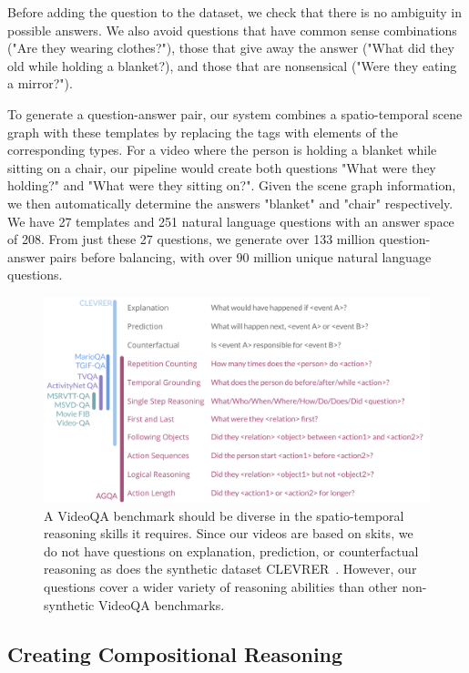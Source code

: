 Before adding the question to the dataset, we check that there is no ambiguity in possible answers. We also avoid questions that have common sense combinations ("Are they wearing clothes?"), those that give away the answer ("What did they old while holding a blanket?), and those that are nonsensical ("Were they eating a mirror?").

To generate a question-answer pair, our system combines a spatio-temporal scene graph with these templates by replacing the tags with elements of the corresponding types. For a video where the person is holding a blanket while sitting on a chair, our pipeline would create both questions "What were they holding?" and "What were they sitting on?". Given the scene graph information, we then automatically determine the answers "blanket" and "chair" respectively. We have 27 templates and 251 natural language questions with an answer space of 208. From just these 27 questions, we generate over 133 million question-answer pairs before balancing, with over 90 million unique natural language questions.

\begin{figure}[t]
    \centering
    \includegraphics[width=\columnwidth]{figures/questions.pdf}
    \caption{A VideoQA benchmark should be diverse in the spatio-temporal reasoning skills it requires. Since our videos are based on skits, we do not have questions on explanation, prediction, or counterfactual reasoning as does the synthetic dataset CLEVRER~\cite{yi2019clevrer}. However, our questions cover a wider variety of reasoning abilities than other non-synthetic VideoQA benchmarks.}
    \label{fig:questions}
\end{figure}

\subsection{Creating Compositional Reasoning}

